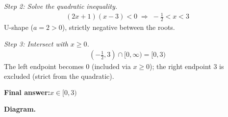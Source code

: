 \documentclass[11pt]{article}
\begin{document}
\textit{Step 2: Solve the quadratic inequality.}
\[\begin{gathered}
(2x + 1)(x - 3) < 0 \;\Longrightarrow\; -\tfrac{1}{2} < x < 3
\end{gathered}\]
U-shape (\( a = 2 > 0 \)), strictly negative between the roots.

\textit{Step 3: Intersect with \( x \geq 0 \).}
\[\begin{gathered}
(-\tfrac{1}{2}, 3) \cap [0, \infty) = [0, 3)
\end{gathered}\]
The left endpoint becomes \( 0 \) (included via \( x \geq 0 \)); the right endpoint \( 3 \) is excluded (strict from the quadratic).

\begin{answerbox}
\textbf{Final answer:}\quad \(\displaystyle x \in [0, 3)\)
\end{answerbox}
\textbf{Diagram.}
\end{document}
